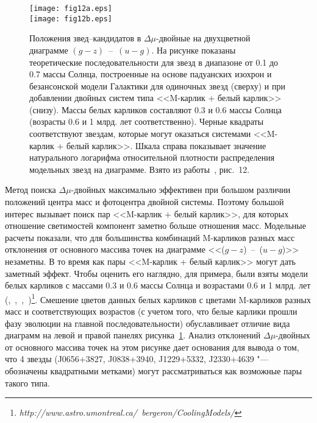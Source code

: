 \begin{figure}[h]
\centering
\texttt{[image: fig12a.eps]}\\
\texttt{[image: fig12b.eps]}
\caption{Положения звед--кандидатов в $\Delta\mu$-двойные на двухцветной диаграмме $(g-z)$~--~$(u-g)$. На рисунке показаны теоретические последовательности для звезд в диапазоне от 0.1 до 0.7 массы Солнца, построенные на основе падуанских изохрон и безансонской модели Галактики для одиночных звезд (сверху) и при добавлении двойных систем типа  <<M-карлик + белый карлик>> (снизу). Массы белых карликов составляют 0.3 и 0.6 массы Солнца (возрасты 0.6 и 1 млрд. лет соответственно). Черные квадраты соответствуют звездам, которые могут оказаться системами  <<M-карлик + белый карлик>>. Шкала справа показывает значение натурального логарифма относительной плотности распределения модельных звезд на диаграмме. Взято из работы~\cite{2015AstL...41..833K}, рис.~12.}
\label{fig:15color}
\end{figure}

Метод поиска $\Delta\mu$-двойных максимально эффективен при большом различии положений центра масс и фотоцентра двойной системы. Поэтому большой интерес вызывает поиск пар <<M-карлик + белый карлик>>, для которых отношение светимостей компонент заметно больше отношения масс. Модельные расчеты показали, что для большинства комбинаций M-карликов разных масс отклонения от основного массива точек на диаграмме <<($g-z$)~--~($u-g$)>> незаметны. В то время как пары <<M-карлик + белый карлик>> могут дать заметный эффект. Чтобы оценить его наглядно, для примера, были взяты модели белых карликов  с массами 0.3 и 0.6 массы Солнца и возрастами 0.6 и 1 млрд. лет (\cite{2006AJ....132.1221H},~\cite{2011ApJ...737...28B},~\cite{2006ApJ...651L.137K},~\cite{2011ApJ...730..128T})\footnote{\textit{http://www.astro.umontreal.ca/~bergeron/CoolingModels/}}. Смешение цветов данных белых карликов с цветами M-карликов разных масс и соответствующих возрастов (с учетом того, что белые карлики прошли фазу эволюции на главной последовательности) обуславливает отличие вида диаграмм на левой и правой панелях рисунка~\ref{fig:15color}.  Анализ отклонений $\Delta\mu$-двойных от основного массива точек на этом рисунке дает основания для вывода о том, что 4 звезды (J0656+3827, J0838+3940, J1229+5332, J2330+4639 "--- обозначены квадратными метками) могут рассматриваться как возможные пары такого типа.

